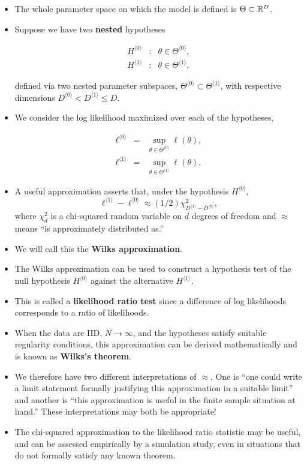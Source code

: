 \documentclass[]{article}
\begin{document}
\begin{itemize}
\item
  The whole parameter space on which the model is defined is
  \(\Theta\subset\mathbb{R}^D\).
\item
  Suppose we have two \textbf{nested} hypotheses

  \begin{eqnarray}
  H^{\langle 0\rangle} &:& \theta\in \Theta^{\langle 0\rangle},
  \\
  H^{\langle 1\rangle} &:& \theta\in \Theta^{\langle 1\rangle},
  \end{eqnarray}

  defined via two nested parameter subspaces,
  \(\Theta^{\langle 0\rangle}\subset \Theta^{\langle 1\rangle}\), with
  respective dimensions
  \(D^{\langle 0\rangle}< D^{\langle 1\rangle}\le D\).
\item
  We consider the log likelihood maximized over each of the hypotheses,

  \begin{eqnarray}
  \ell^{\langle 0\rangle} &=& \sup_{\theta\in \Theta^{\langle 0\rangle}} \ell(\theta),
  \\
  \ell^{\langle 1\rangle} &=& \sup_{\theta\in \Theta^{\langle 1\rangle}} \ell(\theta).
  \end{eqnarray}
\item
  A useful approximation asserts that, under the hypothesis
  \(H^{\langle 0\rangle}\), \[ 
  \ell^{\langle 1\rangle} - \ell^{\langle 0\rangle} \approx (1/2) \chi^2_{D^{\langle 1\rangle}- D^{\langle 0\rangle}},
  \] where \(\chi^2_d\) is a chi-squared random variable on \(d\)
  degrees of freedom and \(\approx\) means ``is approximately
  distributed as.''
\item
  We will call this the \textbf{Wilks approximation}.
\item
  The Wilks approximation can be used to construct a hypothesis test of
  the null hypothesis \(H^{\langle 0\rangle}\) against the alternative
  \(H^{\langle 1\rangle}\).
\item
  This is called a \textbf{likelihood ratio test} since a difference of
  log likelihoods corresponds to a ratio of likelihoods.
\item
  When the data are IID, \(N\to\infty\), and the hypotheses satisfy
  suitable regularity conditions, this approximation can be derived
  mathematically and is known as \textbf{Wilks's theorem}.
\item
  We therefore have two different interpretations of \(\approx\). One is
  ``one could write a limit statement formally justifying this
  approximation in a suitable limit'' and another is ``this
  approximation is useful in the finite sample situation at hand.''
  These interpretations may both be appropriate!
\item
  The chi-squared approximation to the likelihood ratio statistic may be
  useful, and can be assessed empirically by a simulation study, even in
  situations that do not formally satisfy any known theorem.
\end{itemize}
\end{document}
